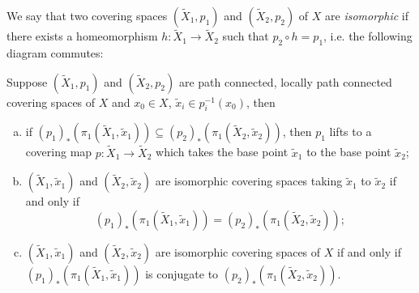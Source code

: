 \begin{definition}
  We say that two covering spaces $(\widetilde{X}_1, p_1)$ and
  $(\widetilde{X}_2, p_2)$ of $X$ are \emph{isomorphic}
  if there exists a homeomorphism $h : \widetilde{X}_1 \to \widetilde{X}_2$
  such that $p_2 \circ h = p_1$, i.e. the following
  diagram commutes:
  \begin{center}
  \end{center}
\end{definition}

\begin{corollary}\label{cor:corollary-25}
  Suppose $(\widetilde{X}_1, p_1)$ and $(\widetilde{X}_2, p_2)$ are
  path connected, locally path connected covering spaces
  of $X$ and $x_0 \in X$, $\widetilde{x}_i \in p_i^{-1}(x_0)$,
  then
  \begin{enumerate}[(a)]
    \item if $(p_1)_*(\pi_1(\widetilde{X}_1, \widetilde{x}_1)) \subseteq
      (p_2)_*(\pi_1(\widetilde{X}_2, \widetilde{x}_2))$, then
      $p_1$ lifts to a covering map
      $p : \widetilde{X}_1 \to \widetilde{X}_2$ which takes
      the base point $\widetilde{x}_1$ to the
      base point $\widetilde{x}_2$;
    \item $(\widetilde{X}_1, \widetilde{x}_1)$ and
      $(\widetilde{X}_2, \widetilde{x}_2)$ are isomorphic
      covering spaces taking
      $\widetilde{x}_1$ to $\widetilde{x}_2$ if and only if
      \[
        (p_1)_*(\pi_1(\widetilde{X}_1, \widetilde{x}_1)) =
        (p_2)_*(\pi_1(\widetilde{X}_2, \widetilde{x}_2));
      \]
    \item $(\widetilde{X}_1, \widetilde{x}_1)$ and
      $(\widetilde{X}_2, \widetilde{x}_2)$ are isomorphic
      covering spaces of $X$ if and only if
      $(p_1)_*(\pi_1(\widetilde{X}_1, \widetilde{x}_1))$
      is conjugate to
      $(p_2)_*(\pi_1(\widetilde{X}_2, \widetilde{x}_2))$.
  \end{enumerate}
\end{corollary}

